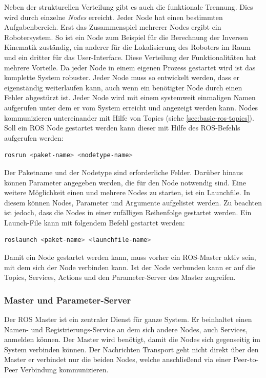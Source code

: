 Neben der strukturellen Verteilung gibt es auch die funktionale Trennung. Dies wird durch einzelne \textit{Nodes} erreicht. Jeder Node hat einen bestimmten Aufgabenbereich. Erst das Zusammenspiel mehrerer Nodes ergibt ein Robotersystem. So ist ein Node zum Beispiel für die Berechnung der Inversen Kinematik zuständig, ein anderer für die Lokalisierung des Roboters im Raum und ein dritter für das User-Interface. Diese Verteilung der Funktionalitäten hat mehrere Vorteile. Da jeder Node in einem eigenen Prozess gestartet wird ist das komplette System robuster. Jeder Node muss so entwickelt werden, dass er eigenständig weiterlaufen kann, auch wenn ein benötigter Node durch einen Fehler abgestürzt ist. Jeder Node wird mit einem systemweit einmaligen Namen aufgerufen unter dem er vom System erreicht und angezeigt werden kann. Nodes kommunizieren untereinander mit Hilfe von Topics (siehe \ref{sec:basic-ros-topics}). Soll ein ROS Node gestartet werden kann dieser mit Hilfe des ROS-Befehls aufgerufen werden:

\begin{lstlisting}[language=bash]
rosrun <paket-name> <nodetype-name>
\end{lstlisting}

Der Paketname und der Nodetype sind erforderliche Felder. Darüber hinaus können Parameter angegeben werden, die für den Node notwendig sind. Eine weitere Möglichkeit einen und mehrere Nodes zu starten, ist ein Launchfile. In diesem können Nodes, Parameter und Argumente aufgelistet werden. Zu beachten ist jedoch, dass die Nodes in einer zufälligen Reihenfolge gestartet werden. Ein Launch-File kann mit folgendem Befehl gestartet werden:

\begin{lstlisting}[language=bash]
roslaunch <paket-name> <launchfile-name>
\end{lstlisting}

Damit ein Node gestartet werden kann, muss vorher ein ROS-Master aktiv sein, mit dem sich der Node verbinden kann. Ist der Node verbunden kann er auf die Topics, Services, Actions und den Parameter-Server des Master zugreifen.

\subsubsection{Master und Parameter-Server}
Der ROS Master ist ein zentraler Dienst für ganze System. Er beinhaltet einen Namen- und Registrierungs-Service an dem sich andere Nodes, auch Services, anmelden können. Der Master wird benötigt, damit die Nodes sich gegenseitig im System verbinden können. Der Nachrichten Transport geht nicht direkt über den Master er verbindet nur die beiden Nodes, welche anschließend via einer Peer-to-Peer Verbindung kommunizieren.

